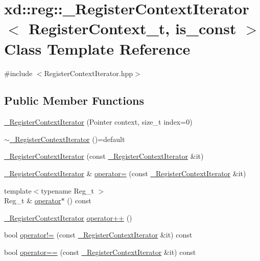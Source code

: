 \hypertarget{classxd_1_1reg_1_1___register_context_iterator}{}\section{xd\+:\+:reg\+:\+:\+\_\+\+Register\+Context\+Iterator$<$ Register\+Context\+\_\+t, is\+\_\+const $>$ Class Template Reference}
\label{classxd_1_1reg_1_1___register_context_iterator}


{\ttfamily \#include $<$Register\+Context\+Iterator.\+hpp$>$}

\subsection*{Public Member Functions}
\begin{DoxyCompactItemize}
\item 
\mbox{\hyperlink{classxd_1_1reg_1_1___register_context_iterator_a53a07e3d8c951883cccfb10013a8100e}{\+\_\+\+Register\+Context\+Iterator}} (Pointer context, size\+\_\+t index=0)
\item 
\mbox{\hyperlink{classxd_1_1reg_1_1___register_context_iterator_abb77e759879fd6aefd8872a2bdcddc95}{$\sim$\+\_\+\+Register\+Context\+Iterator}} ()=default
\item 
\mbox{\hyperlink{classxd_1_1reg_1_1___register_context_iterator_afde74ae5972ae6f515e9c610fe2bf282}{\+\_\+\+Register\+Context\+Iterator}} (const \mbox{\hyperlink{classxd_1_1reg_1_1___register_context_iterator}{\+\_\+\+Register\+Context\+Iterator}} \&it)
\item 
\mbox{\hyperlink{classxd_1_1reg_1_1___register_context_iterator}{\+\_\+\+Register\+Context\+Iterator}} \& \mbox{\hyperlink{classxd_1_1reg_1_1___register_context_iterator_a85c830440ac444725d29290289c409b4}{operator=}} (const \mbox{\hyperlink{classxd_1_1reg_1_1___register_context_iterator}{\+\_\+\+Register\+Context\+Iterator}} \&it)
\item 
{\footnotesize template$<$typename Reg\+\_\+t $>$ }\\Reg\+\_\+t \& \mbox{\hyperlink{classxd_1_1reg_1_1___register_context_iterator_af42ab9a5643d4229a728781819915173}{operator$\ast$}} () const
\item 
\mbox{\hyperlink{classxd_1_1reg_1_1___register_context_iterator}{\+\_\+\+Register\+Context\+Iterator}} \mbox{\hyperlink{classxd_1_1reg_1_1___register_context_iterator_a6e169a865f7edbca7ea6fd5c80c68be1}{operator++}} ()
\item 
bool \mbox{\hyperlink{classxd_1_1reg_1_1___register_context_iterator_acaeeef987ec3dbf1962f8b96f3044680}{operator!=}} (const \mbox{\hyperlink{classxd_1_1reg_1_1___register_context_iterator}{\+\_\+\+Register\+Context\+Iterator}} \&it) const
\item 
bool \mbox{\hyperlink{classxd_1_1reg_1_1___register_context_iterator_aa8c04a63c0eb3fa72baffe4c26ae76eb}{operator==}} (const \mbox{\hyperlink{classxd_1_1reg_1_1___register_context_iterator}{\+\_\+\+Register\+Context\+Iterator}} \&it) const
\end{DoxyCompactItemize}


